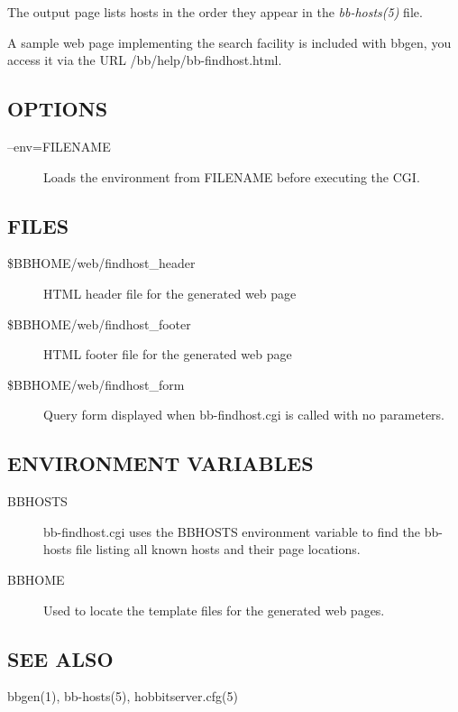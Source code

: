   The output page lists hosts in the order they appear in the
  \emph{bb-hosts(5)} file. 



  A sample web page implementing the search facility is included with
  bbgen, you access it via the URL /bb/help/bb-findhost.html. 



 
\subsection{OPTIONS}
\begin{description}
\item[--env=FILENAME] Loads the environment from FILENAME before executing the CGI. 

 


\end{description}
\subsection{FILES}
\begin{description}
\item[\$BBHOME/web/findhost\_header] HTML header file for the generated web page 

 

\item[\$BBHOME/web/findhost\_footer] HTML footer file for the generated web page 

 

\item[\$BBHOME/web/findhost\_form] Query form displayed when
  bb-findhost.cgi is called with no parameters. 


\end{description}
\subsection{ENVIRONMENT VARIABLES}
\begin{description}
\item[BBHOSTS] bb-findhost.cgi uses the BBHOSTS environment variable
  to find the bb-hosts file listing all known hosts and their page
  locations. 


\item[BBHOME] Used to locate the template files for the generated web pages. 


\end{description}
\subsection{SEE ALSO}
bbgen(1), bb-hosts(5), hobbitserver.cfg(5) 

